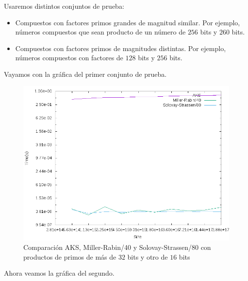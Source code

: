 Usaremos distintos conjuntos de prueba:

\begin{itemize}
	\item Compuestos con factores primos grandes de magnitud similar. Por ejemplo, números compuestos que sean producto de un número de $256$ bits y $260$ bits.
	
	\item Compuestos con factores primos de magnitudes distintas. Por ejemplo, números compuestos con factores de $128$ bits y $256$ bits.
\end{itemize}

Vayamos con la gráfica del primer conjunto de prueba.

\begin{figure}[H]
	\centering
	\includegraphics[totalheight=12cm]{img/graphs/aks-probs-comps-16-mean}
	\caption{Comparación AKS, Miller-Rabin/40 y Solovay-Strassen/80 con productos de primos de más de $32$ bits y otro de $16$ bits}
\end{figure}

Ahora veamos la gráfica del segundo.

